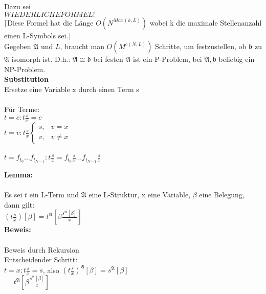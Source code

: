\documentclass[a4paper]{scrartcl}
\newcommand{\mfa}{\mathfrak{A}}  %
\begin{document}
			Dazu sei\\
			$WIEDERLICHE FORMEL!$\medskip\\
			
			$\lceil $Diese Formel hat die Länge $O(N^{Max(k,L)})$ wobei k die maximale Stellenanzahl einen L-Symbols sei.$ \rceil$\\
			Gegeben $\mfa$ und $L$, braucht man $O(M^{c(N,L)})$ Schritte, um festzustellen, ob $\mathfrak{b}$ zu $\mfa$ isomorph ist.
			D.h.: $\mfa \cong \mathfrak{b}$ bei festen $\mfa$ ist ein P-Problem, bei $\mfa , \mathfrak{b}$ beliebig ein NP-Problem. \bigskip\bigskip\\
			
	\textbf{Substitution} \\
		Ersetze eine Variable x durch einen Term s\\\\
		Für Terme:\\
		$t = c: t \frac{s}{x} = c$\medskip\\
		$t = v: t \frac{s}{x}  \begin{cases}  s,&  v=x\\
											  v,&  v\neq x
							\end{cases} $\\\\
		$t = f_{t_{0}}\dots f_{t_{N-1}}: t\frac{s}{x} = f_{t_{0}} \frac{s}{x} \dots f_{t_{N-1}} \frac{s}{x}$
		
		\textbf{Lemma:} \\\\
			Es sei $t$ ein L-Term und $\mfa$ eine L-Struktur, x eine Variable, $\beta$ eine Belegung, dann gilt: \medskip\\
			$(t \frac{s}{x}) \left[ \beta \right] = t^{\mfa} \left[ \beta \frac{s^{\mfa}\left[\beta\right]}{x} \right]$ \medskip\\
		
		\textbf{Beweis:}\\\\
			Beweis durch Rekursion\\
			Entscheidender Schritt:\\
			$t = x: t\frac{s}{x} = s$, also $(t\frac{s}{x})^{\mfa}\left[ \beta \right] = s^{\mfa} \left[ \beta\right]$\medskip\\
			$= t^{\mfa}\left[\beta \frac{s^{\mfa}\left[\beta\right]}{x} \right]$\medskip\\
		
\end{document}
